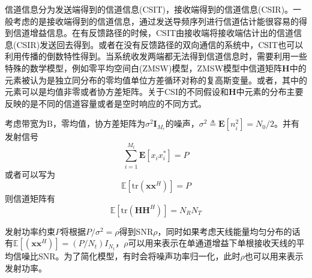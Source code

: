 \documentclass[bachelor,nocolorlinks, printoneside]{seuthesis} %
\begin{document}
\begin{Main}
信道信息分为发送端得到的信道信息(CSIT)，接收端得到的信道信息(CSIR)。一般考虑的是接收端得到的信道信息，通过发送导频序列进行信道估计能很容易的得到信道增益信息。在有反馈路径的时候，CSIT由接收端将接收端估计出的信道信息(CSIR)发送回去得到。或者在没有反馈路径的双向通信的系统中，CSIT也可以利用传播的倒数特性得到。当系统收发两端都无法得到信道信息时，需要利用一些特殊的数学模型，例如零平均空间白(ZMSW)模型，ZMSW模型中信道矩阵$\mathbf{H}$中的元素被认为是独立同分布的零均值单位方差循环对称的复高斯变量。或者，其中的元素可以是均值非零或者协方差矩阵。关于CSI的不同假设和$\mathbf{H}$中元素的分布主要反映的是不同的信道容量或者是空时响应的不同方式。

考虑带宽为B，零均值，协方差矩阵为$\sigma^{2}\mathbf{I}_{M_{r}}$的噪声，$\sigma^{2} \triangleq \mathbf{E}[n^{2}_{i}]= N_{0}/2$。并有发射信号
\begin{equation}\label{key}
\sum_{i=1}^{M_{t}}\mathbf{E}[x_{i}x_{i}^{*}] = P
\end{equation}
或者可以写为
\begin{equation}\label{key}
\mathbb{E}[\mathrm{tr}(\mathbf{x}\mathbf{x}^{H})] = P
\end{equation}
则信道矩阵有
\begin{equation}\label{key}
\mathbb{E}[\mathrm{tr}(\mathbf{H}\mathbf{H}^{H})] = N_{R}N_{T}
\end{equation}

发射功率约束$P$将根据$P/\sigma^{2} = \rho$得到SNR$\rho$，同时如果考虑天线能量均匀分布的话有$\mathbb{E}[(\mathbf{x}\mathbf{x}^{H})] = (P/N_{t})I_{N_{t}} $，$\rho$可以用来表示在单通道增益下单根接收天线的平均信噪比SNR。为了简化模型，有时会将噪声功率归一化，此时$\rho$也可以用来表示发射功率。


\end{Main}
\end{document}
